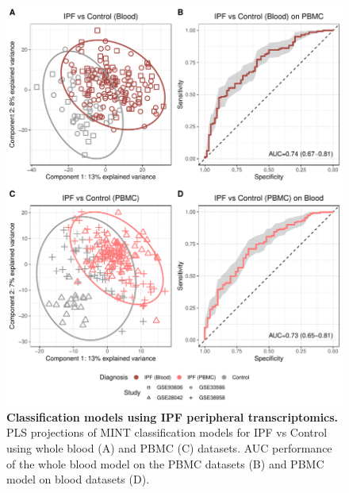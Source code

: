 \documentclass[
]{article}
\begin{document}
\begin{figure}

{\centering \includegraphics[width=1\linewidth,]{./Figures/SysReview/FigE4_blood} 

}

\caption[Peripheral ILD classification models]{\textbf{Classification models using IPF peripheral transcriptomics.} PLS projections of MINT classification models for IPF vs Control using whole blood (A) and PBMC (C) datasets. AUC performance of the whole blood model on the PBMC datasets (B) and PBMC model on blood datasets (D).}\label{fig:bloodmodel}
\end{figure}

\newpage

\captionsetup{width=6.5in}
\end{document}
